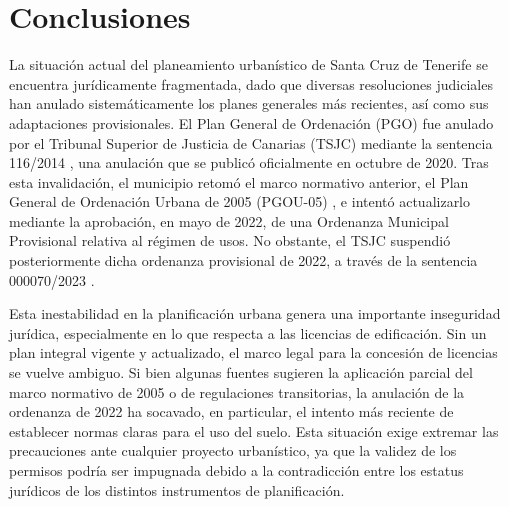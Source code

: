 \section{Conclusiones}

La situación actual del planeamiento urbanístico de Santa Cruz de Tenerife se encuentra jurídicamente fragmentada, dado que diversas resoluciones judiciales han anulado sistemáticamente los planes generales más recientes, así como sus adaptaciones provisionales. El Plan General de Ordenación (PGO) fue anulado por el Tribunal Superior de Justicia de Canarias (TSJC) mediante la sentencia 116/2014 \cite{tsjc_116_2014}, una anulación que se publicó oficialmente en octubre de 2020. Tras esta invalidación, el municipio retomó el marco normativo anterior, el Plan General de Ordenación Urbana de 2005 (PGOU-05) \cite{pgou_santacruz_2005}, e intentó actualizarlo mediante la aprobación, en mayo de 2022, de una Ordenanza Municipal Provisional relativa al régimen de usos. No obstante, el TSJC suspendió posteriormente dicha ordenanza provisional de 2022, a través de la sentencia 000070/2023 \cite{tsjc_070_2023}.

Esta inestabilidad en la planificación urbana genera una importante inseguridad jurídica, especialmente en lo que respecta a las licencias de edificación. Sin un plan integral vigente y actualizado, el marco legal para la concesión de licencias se vuelve ambiguo. Si bien algunas fuentes sugieren la aplicación parcial del marco normativo de 2005 o de regulaciones transitorias, la anulación de la ordenanza de 2022 ha socavado, en particular, el intento más reciente de establecer normas claras para el uso del suelo. Esta situación exige extremar las precauciones ante cualquier proyecto urbanístico, ya que la validez de los permisos podría ser impugnada debido a la contradicción entre los estatus jurídicos de los distintos instrumentos de planificación.
